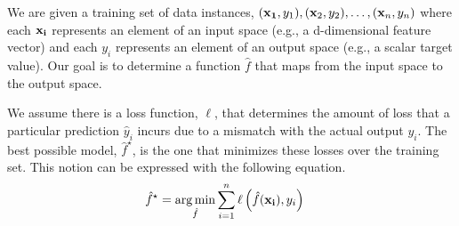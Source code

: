 \documentclass[assignment02_Solutions]{subfiles}
\begin{document}
\begin{recall}
We are given a training set of data instances, $(\mathbf{x_1}, y_1), (\mathbf{x}_2, y_2), \ldots, (\mathbf{x}_n, y_n)$ where each $\mathbf{x_i}$ represents an element of an input space (e.g., a d-dimensional feature vector) and each $y_i$ represents an element of an output space (e.g., a scalar target value).  Our goal is to determine a function $\hat{f}$ that maps from the input space to the output space.

We assume there is a loss function, $\ell$, that determines the amount of loss that a particular prediction $\hat{y}_i$ incurs due to a mismatch with the actual output $y_i$.  The best possible model, $\hat{f}^\star$, is the one that minimizes these losses over the training set.  This notion can be expressed with the following equation.
\begin{align}
\hat{f}^\star &= \operatorname*{arg\,min}_{\hat{f}} \sum_{i=1}^n \ell \left ( \hat{f}(\mathbf{x_i}), y_i \right )
\end{align} 

\end{recall}

\vspace{1em}
\end{document}
